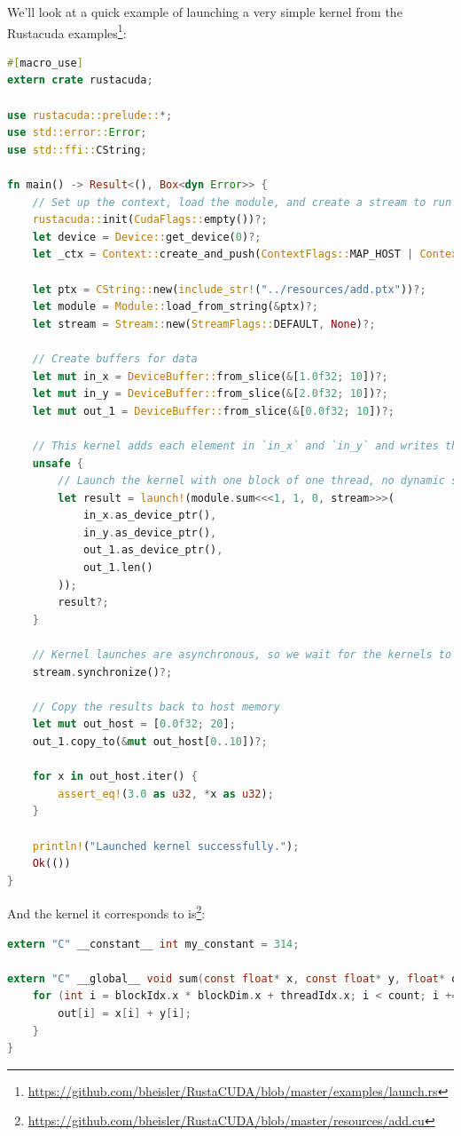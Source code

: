 We'll look at a quick example of launching a very simple kernel from the Rustacuda examples\footnote{\url{https://github.com/bheisler/RustaCUDA/blob/master/examples/launch.rs}}: 
\begin{lstlisting}[language=Rust]
#[macro_use]
extern crate rustacuda;

use rustacuda::prelude::*;
use std::error::Error;
use std::ffi::CString;

fn main() -> Result<(), Box<dyn Error>> {
    // Set up the context, load the module, and create a stream to run kernels in.
    rustacuda::init(CudaFlags::empty())?;
    let device = Device::get_device(0)?;
    let _ctx = Context::create_and_push(ContextFlags::MAP_HOST | ContextFlags::SCHED_AUTO, device)?;

    let ptx = CString::new(include_str!("../resources/add.ptx"))?;
    let module = Module::load_from_string(&ptx)?;
    let stream = Stream::new(StreamFlags::DEFAULT, None)?;

    // Create buffers for data
    let mut in_x = DeviceBuffer::from_slice(&[1.0f32; 10])?;
    let mut in_y = DeviceBuffer::from_slice(&[2.0f32; 10])?;
    let mut out_1 = DeviceBuffer::from_slice(&[0.0f32; 10])?;

    // This kernel adds each element in `in_x` and `in_y` and writes the result into `out`.
    unsafe {
        // Launch the kernel with one block of one thread, no dynamic shared memory on `stream`.
        let result = launch!(module.sum<<<1, 1, 0, stream>>>(
            in_x.as_device_ptr(),
            in_y.as_device_ptr(),
            out_1.as_device_ptr(),
            out_1.len()
        ));
        result?;
    }

    // Kernel launches are asynchronous, so we wait for the kernels to finish executing.
    stream.synchronize()?;

    // Copy the results back to host memory
    let mut out_host = [0.0f32; 20];
    out_1.copy_to(&mut out_host[0..10])?;

    for x in out_host.iter() {
        assert_eq!(3.0 as u32, *x as u32);
    }

    println!("Launched kernel successfully.");
    Ok(())
}
\end{lstlisting}

And the kernel it corresponds to is\footnote{\url{https://github.com/bheisler/RustaCUDA/blob/master/resources/add.cu}}:
\begin{lstlisting}[language=C]
extern "C" __constant__ int my_constant = 314;

extern "C" __global__ void sum(const float* x, const float* y, float* out, int count) {
    for (int i = blockIdx.x * blockDim.x + threadIdx.x; i < count; i += blockDim.x * gridDim.x) {
        out[i] = x[i] + y[i];
    }
}
\end{lstlisting}

